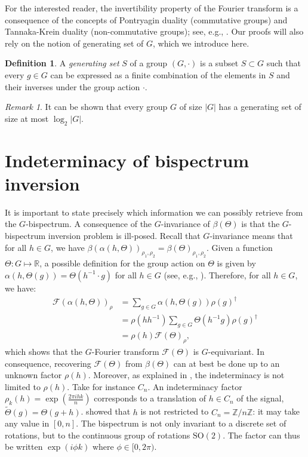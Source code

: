 \documentclass{article}
\theoremstyle{plain}
\theoremstyle{definition}
\newtheorem{definition}[theorem]{Definition}
\theoremstyle{remark}
\newtheorem{remark}[theorem]{Remark}
\begin{document}
For the interested reader, the invertibility property of the Fourier transform is a consequence of the concepts of Pontryagin duality (commutative groups) and Tannaka-Krein duality (non-commutative groups); see, e.g., \cite{joyal_ross_tannaka}.
Our proofs will also rely on the notion of generating set of $G$, which we introduce here.
\begin{definition}
    A \emph{generating set} $S$ of a group $(G, \cdot)$ is a subset $S\subset G$ such that every $g\in G$ can be expressed as a finite combination of the elements in $S$ and their inverses under the group action $\cdot$.
\end{definition}
\begin{remark}
    It can be shown that every group $G$ of size $|G|$ has a generating set of size at most $\log_2 |G|$.
\end{remark}
\section{Indeterminacy of bispectrum inversion}\label{sec:indeterminacy}
It is important to state precisely which information we can possibly retrieve from the $G$-bispectrum.
A consequence of the $G$-invariance of $\beta(\Theta)$ is that the $G$-bispectrum inversion problem is ill-posed. Recall that $G$-invariance means that for all $h\in G$, we have $\beta(\alpha(h,\Theta))_{\rho_1,\rho_2} =\beta(\Theta)_{\rho_1,\rho_2}$. Given a function $\Theta:G\mapsto\mathbb{R}$, a possible definition for the group action on $\Theta$ is given by $\alpha(h, \Theta(g)) =\Theta(h^{-1}\cdot g)$ for all $h\in G$ (see, e.g., \cite{cohenc16}). Therefore, for all $h\in G$, we have:
\begin{align*}
        \mathcal{F}(\alpha(h,\Theta))_\rho &= \sum_{g\in G} \alpha(h, \Theta(g)) \rho(g)^\dagger\\
        &=\rho(hh^{-1})\sum_{g\in G} \Theta(h^{-1}g) \rho(g)^\dagger\\
        &= \rho(h) \mathcal{F}(\Theta)_\rho,
    \end{align*}
which shows that the $G$-Fourier transform $\mathcal{F}(\Theta)$ is $G$-equivariant. In consequence, recovering $\mathcal{F}(\Theta)$ from $\beta(\Theta)$ can at best be done up to an unknown factor $\rho(h)$. Moreover, as explained in \cite{kakarala_thesis, kondor08}, the indeterminacy is not limited to $\rho(h)$. Take for instance $C_n$. An indeterminacy factor $\rho_k(h) = \exp\left(\frac{2\pi i h k}{n}\right)$ corresponds to a translation of $h\in C_n$ of the signal, $\widetilde{\Theta}(g)=\Theta(g+h)$. \cite{kakarala_thesis} showed that $h$ is not restricted to $C_n=\mathbb{Z}/n\mathbb{Z}$: it may take any value in $[0,n]$. The bispectrum is not only invariant to a discrete set of rotations, but to the continuous group of rotations $\mathrm{SO}(2)$. The factor can thus be written $\exp(i \phi k)$ where $\phi\in[0, 2\pi)$.
\end{document}
